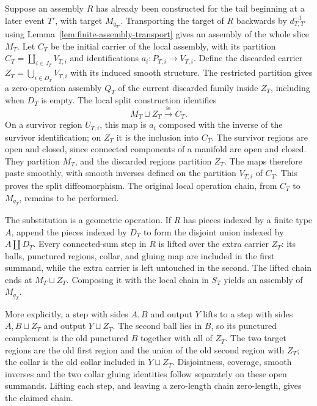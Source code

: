 Suppose an assembly $R$ has already been constructed for the tail beginning
at a later event $T'$, with target $M_{q_{T'}}$.  Transporting the target of
$R$ backwards by $d_{T,T'}^{-1}$ using
Lemma~\ref{lem:finite-assembly-transport} gives an assembly of the whole slice $M_T$.
Let $C_T$ be the initial carrier of the local assembly, with its partition
$C_T=\coprod_{i\in J_T}V_{T,i}$ and identifications
$a_i:P_{T,i}\to V_{T,i}$.  Define the discarded carrier
$Z_T=\bigcup_{i\in D_T}V_{T,i}$ with its induced smooth structure.
The restricted partition gives a zero-operation assembly $Q_T$ of the current
discarded family inside $Z_T$, including when $D_T$ is empty.
The local split construction identifies
\begin{equation}
  M_T\sqcup Z_T\xrightarrow{\cong} C_T.
  \label{eq:local-split}
\end{equation}
On a survivor region $U_{T,i}$, this map is $a_i$ composed with the inverse
of the survivor identification; on $Z_T$ it is the inclusion into $C_T$.
The survivor regions are open and closed, since connected components of a
manifold are open and closed.  They partition $M_T$, and the discarded regions
partition $Z_T$.  The maps therefore paste smoothly, with smooth inverses
defined on the partition $V_{T,i}$ of $C_T$.  This proves the split
diffeomorphism.  The original local operation chain, from $C_T$ to
$M_{q_T}$, remains to be performed.

The substitution is a geometric operation.  If $R$ has pieces indexed by a
finite type $A$, append the pieces indexed by $D_T$ to form the disjoint union
indexed by $A\amalg D_T$.  Every connected-sum step in $R$ is lifted over the
extra carrier $Z_T$: its balls, punctured regions, collar,
and gluing map are included in the first summand, while the extra carrier is
left untouched in the second.  The lifted chain ends at
\(M_T\sqcup Z_T\).  Composing it with the local chain in
$S_T$ yields an assembly of $M_{q_T}$.

More explicitly, a step with sides $A,B$ and output $Y$ lifts to a step with
sides $A,B\sqcup Z_T$ and output $Y\sqcup Z_T$.  The second ball lies in
$B$, so its punctured complement is the old punctured $B$ together with all
of $Z_T$.  The two target regions are the old first region and the union of
the old second region with $Z_T$; the collar is the old collar included in
$Y\sqcup Z_T$.  Disjointness, coverage, smooth inverses and the two collar
gluing identities follow separately on these open summands.  Lifting each
step, and leaving a zero-length chain zero-length, gives the claimed chain.

